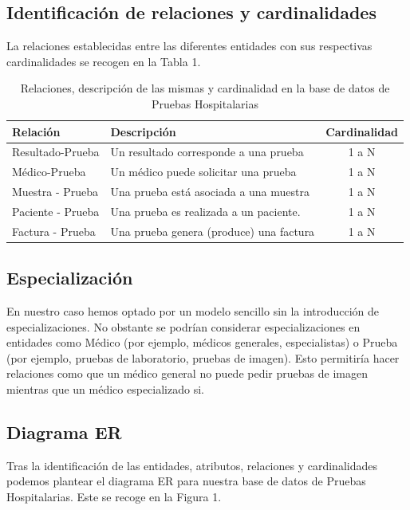 \documentclass[spanish]{article}
\begin{document}
\subsection{Identificación de relaciones y cardinalidades}
La relaciones establecidas entre las diferentes entidades con sus respectivas cardinalidades se recogen en la Tabla 1.

\begin{table}[h]
\centering
\caption{Relaciones, descripción de las mismas y cardinalidad en la base de datos de Pruebas Hospitalarias}
\label{tab:relaciones}
\begin{tabular}{@{}llc@{}}
\toprule
Relación & Descripción & Cardinalidad \\ \midrule
Resultado-Prueba & Un resultado corresponde a una prueba & 1 a N \\
Médico-Prueba & Un médico puede solicitar una prueba & 1 a N \\
Muestra - Prueba & Una prueba está asociada a una muestra & 1 a N \\
Paciente - Prueba & Una prueba es realizada a un paciente. & 1 a N \\
Factura - Prueba & Una prueba genera (produce) una factura & 1 a N \\ \bottomrule
\end{tabular}
\end{table}

\subsection{Especialización}
En nuestro caso hemos optado por un modelo sencillo sin la introducción de especializaciones. No obstante se podrían considerar especializaciones en entidades como Médico (por ejemplo, médicos generales, especialistas) o Prueba (por ejemplo, pruebas de laboratorio, pruebas de imagen). Esto permitiría hacer relaciones como que un médico general no puede pedir pruebas de imagen mientras que un médico especializado si.


\subsection{Diagrama ER}
Tras la identificación de las entidades, atributos, relaciones y cardinalidades podemos plantear el diagrama ER para nuestra base de datos de Pruebas Hospitalarias. Este se recoge en la Figura 1.

\newpage
\end{document}
